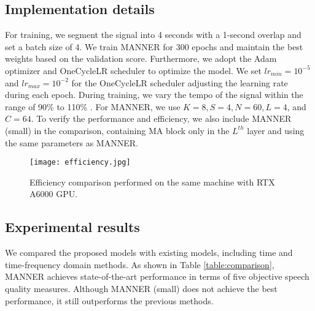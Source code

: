\documentclass{article}
\begin{document}
\subsection{Implementation details}
\label{sec:implementation}
For training, we segment the signal into 4 seconds with a 1-second overlap and set a batch size of 4. We train MANNER for 300 epochs and maintain the best weights based on the validation score. Furthermore, we adopt the Adam optimizer and OneCycleLR scheduler to optimize the model. We set $lr_{min}=10^{-5}$ and $lr_{max}=10^{-2}$ for the OneCycleLR scheduler adjusting the learning rate during each epoch. During training, we vary the tempo of the signal within the range of 90\% to 110\% \cite{ko2015audio}. For MANNER, we use $K=8, S=4, N=60, L=4$, and $C=64$. To verify the performance and efficiency, we also include MANNER (small) in the comparison, containing MA block only in the $L^{th}$ layer and using the same parameters as MANNER.
\begin{figure}[h]
\centerline{\texttt{[image: efficiency.jpg]}}
\caption{Efficiency comparison performed on the same machine with RTX A6000 GPU.}
\label{fig:efficiency comparison}
\end{figure}
\subsection{Experimental results}
\label{sec:experiment results}

We compared the proposed models with existing models, including time and time-frequency domain methods. As shown in Table \ref{table:comparison}, MANNER achieves state-of-the-art performance in terms of five objective speech quality measures. Although MANNER (small) does not achieve the best performance, it still outperforms the previous methods.
\end{document}
